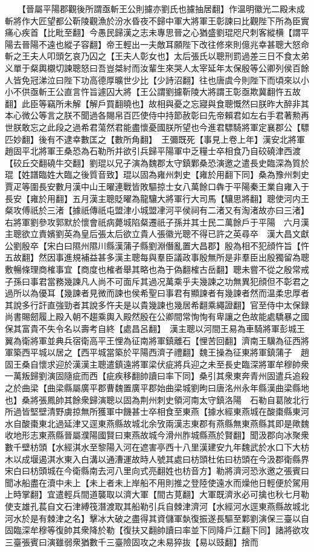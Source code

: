 　　【晉屬平陽郡觀後所謂亟斬王公則攄亦劉氏也攄抽居翻】作温明徽光二殿未成斬將作大匠望都公靳陵觀漁於汾水昏夜不歸中軍大將軍王彰諫曰比觀陛下所為臣實痛心疾首【比毗至翻】今愚民歸漢之志未專思晉之心猶盛劉琨咫尺刺客縱横【謂平陽去晉陽不遠也縱子容翻】帝王輕出一夫敵耳願陛下改往修來則億兆幸甚聰大怒命斬之王夫人叩頭乞哀乃囚之【王夫人彰女也】太后張氏以聰刑罰過差三日不食太弟义單于粲輿櫬切諫聰怒曰吾豈桀紂而汝輩生來哭人太宰延年太保殷等公卿列侯百餘人皆免冠涕泣曰陛下功高德厚曠世少比【少詩沼翻】往也唐虞今則陛下而頃來以小小不供亟斬王公直言忤旨遽囚大將【王公謂劉攄靳陵大將謂王彰亟欺冀翻忤五故翻】此臣等竊所未解【解戶買翻曉也】故相與憂之忘寢與食聰慨然曰朕昨大醉非其本心微公等言之朕不聞過各賜帛百匹使侍中持節赦彰曰先帝賴君如左右手君著勲再世朕敢忘之此段之過希君蕩然君能盡懷憂國朕所望也今進君驃騎將軍定襄郡公【驃匹妙翻】後有不逮幸數匡之【數所角翻】　王彌既死【事見上卷上年】漢安北將軍趙固平北將軍王桑恐為石勒所并欲引兵歸平陽軍中乏糧士卒相食乃自䂭磽津西渡【䂭丘交翻磽牛交翻】劉琨以兄子演為魏郡太守鎮鄴桑恐演邀之遣長史臨深為質於琨【姓譜臨姓大臨之後質音致】琨以固為雍州刺史【雍於用翻下同】桑為豫州刺史　賈疋等圍長安數月漢中山王曜連戰皆敗驅掠士女八萬餘口犇于平陽秦王業自雍入于長安【雍於用翻】五月漢主聰貶曜為龍驤大將軍行大司馬【驤思將翻】聰使河内王粲攻傅祇於三渚【據祇傳祇屯盟津小城盟冿河平侯祠有二渚又有淘渚故亦曰三渚】右將軍劉參攻郭默於懷會祇病薨城陷粲遷祇子孫并其士民二萬餘戶于平陽　六月漢主聰欲立責嬪劉英為皇后張太后欲立貴人張徽光聰不得已許之英尋卒　漢大昌文獻公劉殷卒【宋白曰隰州隰川縣漢蒲子縣劉淵僭亂置大昌郡】殷為相不犯顔忤旨【忤五故翻】然因事進規補益甚多漢主聰每與羣臣議政事殷無所是非羣臣出殷獨留為聰敷暢條理商榷事宜【商度也榷者舉其略也為于偽翻榷古岳翻】聰未嘗不從之殷常戒子孫曰事君當務幾諫凡人尚不可面斥其過况萬乘乎夫幾諫之功無異犯顔但不彰君之過所以為優耳【幾諫者見微而諫也侯希聖曰事君有顯諫者有幾諫者然而温柔忠厚者其說多行訐直強勁者其說多忤夫是以貴幾諫也幾居希翻乘繩證翻】官至侍中太保録尚書賜劒履上殿入朝不趨乘輿入殿然殷在公卿間常恂恂有卑讓之色故能處驕暴之國保其富貴不失令名以壽考自終【處昌呂翻】　漢主聰以河間王易為車騎將軍彭城王翼為衛將軍並典兵宿衛高平王悝為征南將軍鎮離石【悝苦回翻】濟南王驥為征西將軍築西平城以居之【西平城當築於平陽西濟子禮翻】魏王操為征東將軍鎮蒲子　趙固王桑自懷求迎於漢漢主聰遣鎮遠將軍梁伏疵將兵迎之未至長史臨深將軍牟穆帥衆一萬叛歸劉演固隨疵而西【疵疾移翻帥讀曰率下同】桑引其衆東奔青州固遣兵追殺之於曲梁【曲梁縣屬廣平郡曹魏置廣平郡始曲梁城劉昫曰唐洺州永年縣漢曲梁縣地也】桑將張鳳帥其餘衆歸演聰以固為荆州刺史領河南太守鎮洛陽　石勒自葛陂北行所過皆堅壁清野虜掠無所獲軍中饑甚士卒相食至東燕【據水經東燕城在酸棗縣東河水自酸棗東北過延津又逕東燕縣故城北余攷兩漢志東郡有燕縣無東燕縣其即是歟魏收地形志東燕縣晉屬濮陽國賢曰東燕故城今滑州胙城縣燕於賢翻】聞汲郡向冰聚衆數千壁枋頭【水經淇水至黎陽入河在遮害亭西十八里漢建安九年魏武於水口下大枋木以成堰遏淇水東入白溝以通漕運故時人號其處曰枋頭杜佑曰枋頭在今汲郡衛縣界宋白曰枋頭城在今衛縣南去河八里向式亮翻姓也枋音方】勒將濟河恐氷邀之張賓曰聞冰船盡在瀆中未上【未上者未上岸船不用則推之登陸使遠水而燥他日輕便於駕用上時掌翻】宜遣輕兵間道襲取以濟大軍【間古莧翻】大軍既濟氷必可擒也秋七月勒使支雄孔萇自文石津縛筏潛渡取其船勒引兵自棘津濟河【水經河水逕東燕縣故城北河水於是有棘津之名】擊冰大破之盡得其資儲軍埶復振遂長驅至鄴劉演保三臺以自固臨深牟穆等復帥其衆降於勒【復扶又翻帥讀曰率並下同降戶江翻下同】諸將欲攻三臺張賓曰演雖弱衆猶數千三臺險固攻之未易猝抜【易以豉翻】捨而